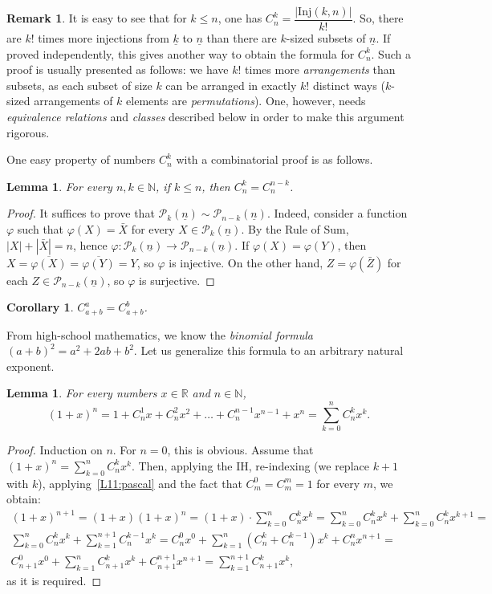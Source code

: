 \documentclass[12pt,notitlepage]{article}
\theoremstyle{plain}
\newtheorem{lemma}[thm]{Lemma}
\newtheorem{corr}[thm]{Corollary}
\theoremstyle{definition}
\newtheorem{rem}[thm]{Remark}
\theoremstyle{plain}
\newcommand{\N}{\mathbb{N}}
\newcommand{\R}{\mathbb{R}}
\newcommand{\mP}{\mathcal{P}}
\renewcommand{\phi}{\varphi}
\newcommand{\ul}[1]{\underline{#1}}
\newcommand{\1}{\mathbf{1}}
\newcommand{\0}{\mathbf{0}}
\begin{document}
\begin{rem}
It is easy to see that for $k \leq n$, one has $C_n^k = \dfrac{|\mathrm{Inj}(k,n)|}{k!}$. So, there are $k!$ times more injections from $\ul{k}$ to $\ul{n}$ than there are $k$-sized subsets of $\ul{n}$. If proved independently, this gives another way to obtain the formula for $C_n^k$. Such a proof is usually presented as follows: we have $k!$ times more \emph{arrangements} than subsets, as each subset of size $k$ can be arranged in exactly $k!$ distinct ways ($k$-sized arrangements of $k$ elements are \emph{permutations}). One, however, needs \emph{equivalence relations} and \emph{classes} described below in order to make this argument rigorous.
\end{rem}

\noindent One easy property of numbers $C_n^k$ with a combinatorial proof is as follows.
\begin{lemma}
For every $n, k \in \N$, if $k \leq n$, then $C_n^k = C_n^{n-k}$.
\end{lemma}
\begin{proof}
It suffices to prove that $\mP_k(\ul{n}) \sim \mP_{n - k}(\ul{n})$. Indeed, consider a function $\phi$ such that $\phi(X) = \bar X$ for every $X \in  \mP_k(\ul{n})$. By the Rule of Sum, $|X| + |\bar X| = n$, hence $\phi \colon\mP_k(\ul{n}) \to \mP_{n - k}(\ul{n})$. If $\phi(X) = \phi(Y)$, then $X = \overline{\phi(X)} = \overline{\phi(Y)} = Y$, so $\phi$ is injective. On the other hand, $Z = \phi(\bar Z)$ for each $Z \in \mP_{n - k}(\ul{n})$, so $\phi$ is surjective.
\end{proof}
\begin{corr}\label{L11:bin_add}
$C_{a + b}^a = C_{a + b}^b$.
\end{corr}

From high-school mathematics, we know the \emph{binomial formula} $(a + b)^2 = a^2 + 2ab + b^2$. Let us generalize this formula to an arbitrary natural exponent.

\begin{lemma}\label{L11:binom_1}
For every numbers $x \in \R$ and $n \in \N$,
$$(1 + x)^n = 1 + C_n^1 x + C_n^2 x^2 + \ldots + C_n^{n-1}x^{n-1} + x^n = \sum_{k = 0}^n C_n^k x^k.$$
\end{lemma}
\begin{proof}
Induction on $n$. For $n = 0$, this is obvious. Assume that $(1 + x)^n = \sum_{k = 0}^n C_n^k x^k$. Then, applying the IH, re-indexing (we replace $k + 1$ with $k$), applying~\ref{L11:pascal} and the fact that $C_m^0 = C_m^m = 1$ for every $m$, we obtain:
\begin{multline*}
(1 + x)^{n + 1} = (1 + x)(1 + x)^n =  (1 + x) \cdot \sum_{k = 0}^n C_n^k x^k = \sum_{k = 0}^n C_n^k x^k  + \sum_{k = 0}^n C_n^k x^{k + 1} =\\
  \sum_{k = 0}^n C_n^k x^k  + \sum_{k = 1}^{n+1} C_n^{k - 1} x^{k} =
C_n^0 x^0 + \sum_{k = 1}^n (C_n^k + C_n^{k-1}) x^k + C_n^n x^{n+1} =\\
 C_{n+1}^0 x^0 + \sum_{k = 1}^n C_{n+1}^k x^k + C_{n+1}^{n+1} x^{n+1} = \sum_{k = 1}^{n+1} C_{n+1}^k x^k,
\end{multline*}
as it is required.
\end{proof}
\end{document}
